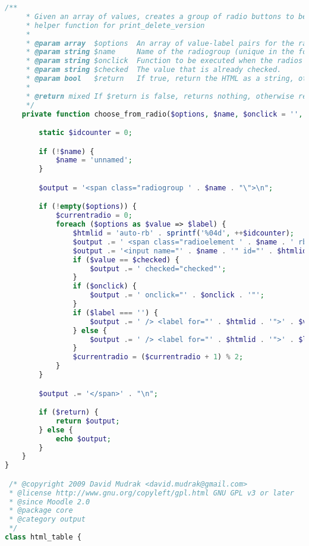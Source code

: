 \begin{lstlisting}[language=PHP]
    /**
     * Given an array of values, creates a group of radio buttons to be part of a form
     * helper function for print_delete_version
     *
     * @param array  $options  An array of value-label pairs for the radio group (values as keys).
     * @param string $name     Name of the radiogroup (unique in the form).
     * @param string $onclick  Function to be executed when the radios are clicked.
     * @param string $checked  The value that is already checked.
     * @param bool   $return   If true, return the HTML as a string, otherwise print it.
     *
     * @return mixed If $return is false, returns nothing, otherwise returns a string of HTML.
     */
    private function choose_from_radio($options, $name, $onclick = '', $checked = '', $return = false) {

        static $idcounter = 0;

        if (!$name) {
            $name = 'unnamed';
        }

        $output = '<span class="radiogroup ' . $name . "\">\n";

        if (!empty($options)) {
            $currentradio = 0;
            foreach ($options as $value => $label) {
                $htmlid = 'auto-rb' . sprintf('%04d', ++$idcounter);
                $output .= ' <span class="radioelement ' . $name . ' rb' . $currentradio . "\">";
                $output .= '<input name="' . $name . '" id="' . $htmlid . '" type="radio" value="' . $value . '"';
                if ($value == $checked) {
                    $output .= ' checked="checked"';
                }
                if ($onclick) {
                    $output .= ' onclick="' . $onclick . '"';
                }
                if ($label === '') {
                    $output .= ' /> <label for="' . $htmlid . '">' . $value . '</label></span>' . "\n";
                } else {
                    $output .= ' /> <label for="' . $htmlid . '">' . $label . '</label></span>' . "\n";
                }
                $currentradio = ($currentradio + 1) % 2;
            }
        }

        $output .= '</span>' . "\n";

        if ($return) {
            return $output;
        } else {
            echo $output;
        }
    }
}

 /* @copyright 2009 David Mudrak <david.mudrak@gmail.com>
 * @license http://www.gnu.org/copyleft/gpl.html GNU GPL v3 or later
 * @since Moodle 2.0
 * @package core
 * @category output
 */
class html_table {


\end{lstlisting}
